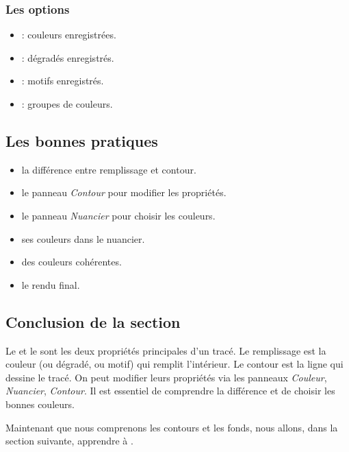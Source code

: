\subsubsection{Les options}

\begin{itemize}
    \item {} : couleurs enregistrées.
    \item {} : dégradés enregistrés.
    \item {} : motifs enregistrés.
    \item {} : groupes de couleurs.
\end{itemize}

\subsection{Les bonnes pratiques}

\begin{itemize}
    \item {} la différence entre remplissage et contour.
    \item {} le panneau \emph{Contour} pour modifier les propriétés.
    \item {} le panneau \emph{Nuancier} pour choisir les couleurs.
    \item {} ses couleurs dans le nuancier.
    \item {} des couleurs cohérentes.
    \item {} le rendu final.
\end{itemize}

\subsection*{Conclusion de la section}

Le  et le  sont les deux propriétés principales d'un tracé. Le remplissage est la couleur (ou dégradé, ou motif) qui remplit l'intérieur. Le contour est la ligne qui dessine le tracé. On peut modifier leurs propriétés via les panneaux \emph{Couleur}, \emph{Nuancier}, \emph{Contour}. Il est essentiel de comprendre la différence et de choisir les bonnes couleurs.

Maintenant que nous comprenons les contours et les fonds, nous allons, dans la section suivante, apprendre à .

